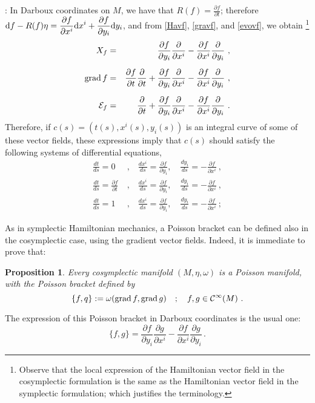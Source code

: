 \documentclass[12pt]{report}
\newtheorem{prop}[teor]{Proposition}
\def\beq{\begin{equation}}
\def\eeq{\end{equation}}
\def\bea{\begin{eqnarray}}
\def\eea{\end{eqnarray}}
\def\dst{\displaystyle}
\def\derpar#1#2{\frac{\partial{#1}}{\partial{#2}}}
\def\d{{\rm d}}
\begin{document}
:
In Darboux coordinates on $M$, we have that $\dst R(f)=\derpar{f}{t}$; therefore
$\dst \d f- R(f)\eta=\derpar{f}{x^i}\d x^i+\derpar{f}{y_i}\d y_i$, and from \eqref{Havf}, \eqref{gravf}, and \eqref{evovf},
we obtain
\footnote{
 Observe that the local expression of the Hamiltonian vector field in the cosymplectic formulation is the same as the Hamiltonian vector field in the symplectic formulation;
which justifies the terminology.}
\bea
    X_f &=& \frac{\partial f}{\partial y_ i}\frac{\partial}{\partial x^i}- \frac{\partial f}{\partial x^i}\frac{\partial}{\partial y_i}\ , \nonumber \\
\noalign{\medskip}
    {\rm grad}\,f &=& \frac{\partial f}{\partial t}\frac{\partial}{\partial t} + \frac{\partial f}{\partial y_ i}\frac{\partial}{\partial x^i}- \frac{\partial f}{\partial x^i}\frac{\partial}{\partial y_i}\ ,\nonumber \\
\noalign{\medskip}
    {\cal E}_f &=& \frac{\partial}{\partial t} + \frac{\partial f}{\partial y_ i}\frac{\partial}{\partial x^i}- \frac{\partial f}{\partial x^i}\frac{\partial}{\partial y_i}\ .
\label{evocoor1}
\eea
Therefore, if $c(s)=(t(s),x^i(s), y_i(s))$ is an integral curve of some of these vector fields, these expressions imply that $c(s)$ should satisfy the following systems of differential equations,
\bea
\frac{dt}{ds}=0 \ &,& \
\frac{dx^i}{ds}=\frac{\partial f}{\partial y_i} ,\quad 
\frac{dy_i}{ds}= -\frac{\partial f}{\partial x^i}\ , \nonumber \\
\frac{dt}{ds}=\frac{\partial f}{\partial t} \ &,& \
\frac{dx^i}{ds}=\frac{\partial f}{\partial y_i} ,\quad 
\frac{dy_i}{ds}= -\frac{\partial f}{\partial x^i}\ , \nonumber \\
\frac{dt}{ds}=1 \ &,& \
\frac{dx^i}{ds}=\frac{\partial f}{\partial y_i} ,\quad 
\frac{dy_i}{ds}= -\frac{\partial f}{\partial x^i}\ ;
\label{evocoor2}
\eea

As in symplectic Hamiltonian mechanics, a Poisson bracket can be defined
also in the cosymplectic case, using the gradient vector fields. Indeed, it is immediate to prove that:

\begin{prop}
\label{4.6}
Every cosymplectic manifold $(M,\eta,\omega)$ is
a {\sl Poisson manifold}, with the {\sl Poisson bracket} defined by
\[
    \{f,q\}:=\omega({\rm grad}\, f,{\rm grad}\, g) \quad ; \quad 
f,g\in\mathcal{C}^\infty(M) \ .
\]
\end{prop}

The expression of this Poisson bracket in Darboux coordinates is the usual one:
\beq
\label{PBcoor}
    \{f,g\}= \frac{\partial f}{\partial y_i}\frac{\partial g}{\partial x^i}- \frac{\partial f}{\partial x^i}\frac{\partial g}{\partial y_i}\,.
\eeq
\end{document}

